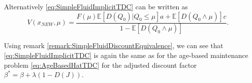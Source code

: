 \begin{corollary}
	Alternatively \eqref{eq:SimpleFluidImplicitTDC} can be written as
	\begin{equation}\label{eq:SimpleFluidExplicitTDC}
	V(x_{NEW},\mu)=\frac{F(\mu)\mathbb{E}[D(Q_0)|Q_0\leq \mu]a+\mathbb{E}[D(Q_0\wedge\mu)]c}{1-\mathbb{E}[D(Q_0\wedge\mu)]}.
	\end{equation}
\end{corollary}

\begin{remark}\label{remark:SimpleFluidTDCEquivalence}
	Using remark \ref{remark:SimpleFluidDiscountEquivalence}, we can see that \eqref{eq:SimpleFluidImplicitTDC} is again the same as for the age-based maintenance problem \eqref{eq:AgeBasedHatTDC} for the adjusted discount factor $\beta^*=\beta+\lambda(1-D(J))$.
\end{remark}
